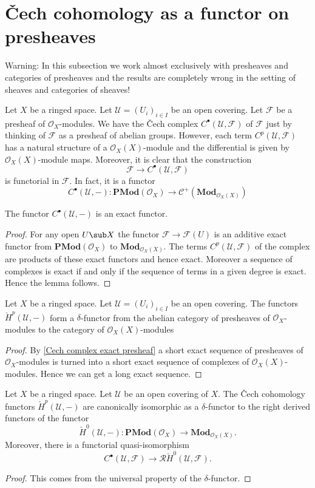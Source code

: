 \section{\v{C}ech cohomology as a functor on presheaves}
Warning: In this subsection we work almost exclusively with presheaves and categories of presheaves and the results are completely wrong in the setting of sheaves and categories of sheaves!\par
Let $X$ be a ringed space. Let $\mathcal{U}=(U_i)_{i\in I}$ be an open covering. Let $\mathscr{F}$ be a presheaf of $\mathcal{O}_X$-modules. We have the \v{C}ech complex $C^\bullet(\mathcal{U},\mathscr{F})$ of $\mathscr{F}$ just by thinking of $\mathscr{F}$ as a presheaf of abelian groups. However, each term $C^p(\mathcal{U},\mathscr{F})$ has a natural structure of a $\mathcal{O}_X(X)$-module and the differential is given by $\mathcal{O}_X(X)$-module maps. Moreover, it is clear that the construction
\[\mathscr{F}\to C^\bullet(\mathcal{U},\mathscr{F})\]
is functorial in $\mathscr{F}$. In fact, it is a functor
\[C^\bullet(\mathcal{U},-):\mathbf{PMod}(\mathscr{O}_X)\to\mathcal{C}^+(\mathbf{Mod}_{\mathscr{O}_X(X)})\]
\begin{proposition}\label{Cech complex exact presheaf}
The functor $C^\bullet(\mathcal{U},-)$ is an exact functor.
\end{proposition}
\begin{proof}
For any open $U\sub X$ the functor $\mathscr{F}\to\mathscr{F}(U)$ is an additive exact functor from $\mathbf{PMod}(\mathcal{O}_X)$ to $\mathbf{Mod}_{\mathscr{O}_X(X)}$. The terms $C^p(\mathcal{U},\mathscr{F})$ of the complex are products of these exact functors and hence exact. Moreover a sequence of complexes is exact if and only if the sequence of terms in a given degree is exact. Hence the lemma follows.
\end{proof}
\begin{theorem}\label{Cech presheaf delta functor}
Let $X$ be a ringed space. Let $\mathcal{U}=(U_i)_{i\in I}$ be an open covering. The functors $\check{H}^p(\mathcal{U},-)$ form a $\delta$-functor from the abelian category of presheaves of $\mathscr{O}_X$-modules to the category of $\mathscr{O}_X(X)$-modules
\end{theorem}
\begin{proof}
By \cref{Cech complex exact presheaf} a short exact sequence of presheaves of $\mathscr{O}_X$-modules is turned into a short exact sequence of complexes of $\mathscr{O}_X(X)$-modules. Hence we can get a long exact sequence.
\end{proof}
\begin{proposition}
Let $X$ be a ringed space. Let $\mathcal{U}$ be an open covering of $X$. The \v{C}ech cohomology functors $\check{H}^p(\mathcal{U},-)$ are canonically isomorphic as a $\delta$-functor to the right derived functors of the functor 
\[\check{H}^0(\mathcal{U},-):\mathbf{PMod}(\mathscr{O}_X)\to\mathbf{Mod}_{\mathscr{O}_X(X)}.\]
Moreover, there is a functorial quasi-isomorphism
\[C^\bullet(\mathcal{U},\mathscr{F})\to\mathcal{R}\check{H}^0(\mathcal{U},\mathscr{F}).\]
\end{proposition}
\begin{proof}
This comes from the universal property of the $\delta$-functor.
\end{proof}
